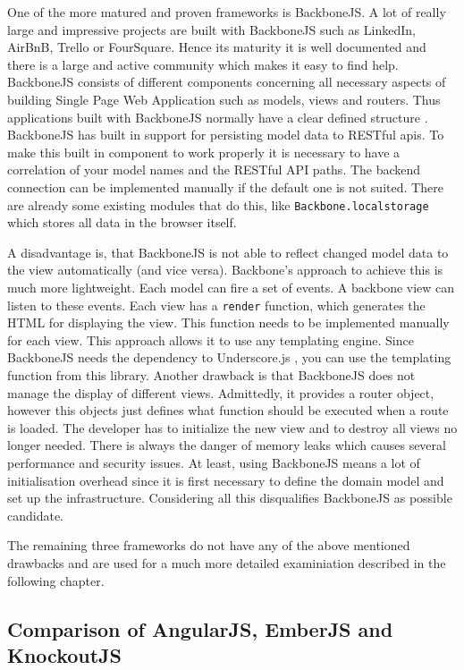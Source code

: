 One of the more matured and proven frameworks is BackboneJS.
A lot of really large and impressive projects are built with BackboneJS such as LinkedIn, AirBnB, Trello or FourSquare.
Hence its maturity it is well documented and there is a large and active community which makes it easy to find help.
BackboneJS  consists of different components concerning all necessary aspects of building Single Page Web Application such as models, views and routers.
Thus applications built with BackboneJS normally have a clear defined structure \autocite{tech-ana:heise-backbone}.
BackboneJS has built in support for persisting model data to RESTful apis.
To make this built in component to work properly it is necessary to have a correlation of your model names and the RESTful API paths.
The backend connection can be implemented manually if the default one is not suited.
There are already some existing modules that do this, like \texttt{Backbone.localstorage} which stores all data in the browser itself.

A disadvantage is, that BackboneJS is not able to reflect changed model data to the view automatically (and vice versa).
Backbone's approach to achieve this is much more lightweight.
Each model can fire a set of events.
A backbone view can listen to these events.
Each view has a \texttt{render} function, which generates the HTML for displaying the view.
This function needs to be implemented manually for each view.
This approach allows it to use any templating engine.
Since BackboneJS needs the dependency to Underscore.js , you can use the templating function from this library.
Another drawback is that BackboneJS does not manage the display of different views.
Admittedly, it provides a router object, however this objects just defines what function should be executed when a route is loaded.
The developer has to initialize the new view and to destroy all views no longer needed.
There is always the danger of memory leaks which causes several performance and security issues.
At least, using BackboneJS means a lot of initialisation overhead since it is first necessary to define the domain model and set up the infrastructure.
Considering all this disqualifies BackboneJS as possible candidate.
      
The remaining three frameworks do not have any of the above mentioned drawbacks and are used for a much more detailed examiniation described in the following chapter.

\subsection{Comparison of AngularJS, EmberJS and KnockoutJS}\label{chap:detail_comparison}


